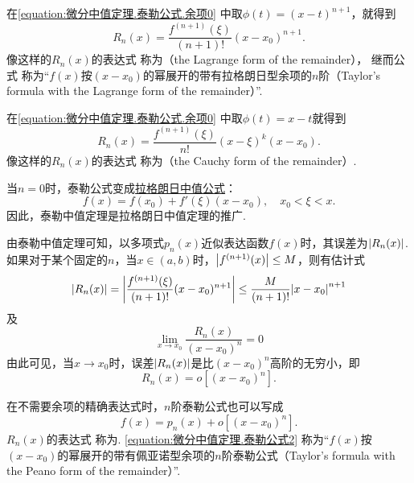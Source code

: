 在\cref{equation:微分中值定理.泰勒公式.余项0} 中取\(\phi(t) = (x-t)^{n+1}\)，就得到
\begin{equation}\label{equation:微分中值定理.泰勒公式.余项1}
R_n(x) = \frac{f^{(n+1)}(\xi)}{(n+1)!} (x-x_0)^{n+1}.
\end{equation}
像这样的\(R_n(x)\)的表达式  称为（the Lagrange form of the remainder），
继而公式  称为“\(f(x)\)按\((x-x_0)\)的幂展开的带有拉格朗日型余项的\(n\)阶（Taylor's formula with the Lagrange form of the remainder）”.

在\cref{equation:微分中值定理.泰勒公式.余项0} 中取\(\phi(t) = x-t\)就得到
\begin{equation}\label{equation:微分中值定理.泰勒公式.余项4}
R_n(x) = \frac{f^{(n+1)}(\xi)}{n!} (x-\xi)^k (x-x_0).
\end{equation}
像这样的\(R_n(x)\)的表达式  称为（the Cauchy form of the remainder）.

当\(n=0\)时，泰勒公式变成\hyperref[equation:微分中值定理.拉格朗日中值公式]{拉格朗日中值公式}：\[
f(x) = f(x_0) + f'(\xi) (x-x_0), \quad x_0 < \xi < x.
\]因此，泰勒中值定理是拉格朗日中值定理的推广.

由泰勒中值定理可知，以多项式\(p_n(x)\)近似表达函数\(f(x)\)时，其误差为\(\abs{R_n(x)}\).如果对于某个固定的\(n\)，当\(x\in(a,b)\)时，\(\abs{f^{(n+1)}(x)} \leq M\)，则有估计式\begin{equation}\label{equation:微分中值定理.泰勒公式.误差1}
\abs{R_n(x)}
= \abs{\frac{f^{(n+1)}(\xi)}{(n+1)!} (x-x_0)^{n+1}}
\leq \frac{M}{(n+1)!} \abs{x-x_0}^{n+1}
\end{equation}及\[
\lim\limits_{x \to x_0} \frac{R_n(x)}{(x-x_0)^n} = 0
\]由此可见，当\(x \to x_0\)时，误差\(\abs{R_n(x)}\)是比\((x-x_0)^n\)高阶的无穷小，即\begin{equation}\label{equation:微分中值定理.泰勒公式.余项2}
R_n(x) = o[(x-x_0)^n].
\end{equation}

在不需要余项的精确表达式时，\(n\)阶泰勒公式也可以写成
\begin{equation}\label{equation:微分中值定理.泰勒公式2}
f(x) = p_n(x) + o[(x - x_0)^n].
\end{equation}
\(R_n(x)\)的表达式  称为.
\cref{equation:微分中值定理.泰勒公式2} 称为“\(f(x)\)按\((x-x_0)\)的幂展开的带有佩亚诺型余项的\(n\)阶泰勒公式（Taylor's formula with the Peano form of the remainder）”.

